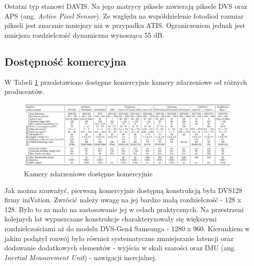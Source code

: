     \indent Ostatni typ stanowi DAVIS. Na jego matrycy piksele zawierają piksele DVS oraz APS (ang. \emph{Active Pixel Sensor}). Ze względu na współdzielenie fotodiod rozmiar pikseli jest znacznie mniejszy niż w przypadku ATIS. Ograniczeniem jednak jest mniejsza rozdzielczość dynamiczna wynosząca 55 dB.
    
    
    
    \subsection{Dostępność komercyjna}
    \label{subsec:Dostepnosc}
    W Tabeli \ref{fig:Komercyjne} przedstawiono dostępne komercyjnie kamery zdarzeniowe od różnych producentów.
    
   \begin{figure}[h]
       \centering
       \includegraphics[width=\textwidth]{Thesis/Literatura/Events/KamryZdarzenioweNaRynku.PNG}
       \caption{Kamery zdarzeniowe dostępne komercyjnie \cite{Sourvey}}
       \label{fig:Komercyjne}
   \end{figure}
   
   Jak można zauważyć, pierwszą komercyjnie dostępną konstrukcją była DVS128 firmy iniVation. Zwrócić należy uwagę na jej bardzo małą rozdzielczość - 128 x 128. Było to za mało na zastosowanie jej w celach praktycznych. Na przestrzeni kolejnych lat wypuszczane konstrukcje charakteryzowały się większymi rozdzielczościami aż do modelu DVS-Gen4 Samsunga - 1280 x 960. Kierunkiem w jakim podążył rozwój było również systematyczne zmniejszanie latencji oraz dodawanie dodatkowych elementów - wyjścia w skali szarości oraz IMU (ang. \emph{Inertial Measurement Unit}) - nawigacji inercjalnej.\\
   
